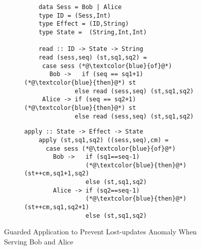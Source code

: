 \begin{figure}[t]
	\centering
	\begin{subfigure}[t]{0.53\textwidth}
	\begin{lstlisting}
	data Sess = Bob | Alice
	type ID = (Sess,Int) 
	type Effect = (ID,String)
 	type State =  (String,Int,Int)
	
	read :: ID -> State -> String
	read (sess,seq) (st,sq1,sq2) = 
 	 case sess (*@\textcolor{blue}{of}@*) 
	   Bob ->   if (seq == sq1+1) (*@\textcolor{blue}{then}@*) st
              else read (sess,seq) (st,sq1,sq2)
     Alice -> if (seq == sq2+1) (*@\textcolor{blue}{then}@*) st
              else read (sess,seq) (st,sq1,sq2)
	\end{lstlisting}		  
	\end{subfigure}
	\hfill
	\begin{subfigure}[t]{0.42\textwidth}
	\begin{lstlisting}[firstnumber=13]
	apply :: State -> Effect -> State 
	apply (st,sq1,sq2) ((sess,seq),cm) = 
	  case sess (*@\textcolor{blue}{of}@*) 
	    Bob ->   if (sq1==seq-1)
	             (*@\textcolor{blue}{then}@*) (st++cm,sq1+1,sq2)
	             else (st,sq1,sq2)
	    Alice -> if (sq2==seq-1)
	             (*@\textcolor{blue}{then}@*) (st++cm,sq1,sq2+1)
	             else (st,sq1,sq2)
	\end{lstlisting}		  
        \end{subfigure}

	\hrulefill
	\caption{Guarded Application to Prevent Lost-updates Anomaly
	When Serving Bob and Alice}
	\label{fig:modified_code}
\end{figure}


